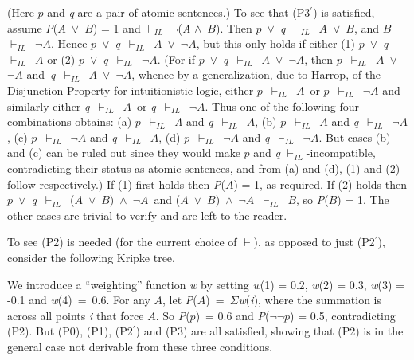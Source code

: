 \documentclass[
  11pt,
  letterpaper,
  DIV=11,
  numbers=noendperiod,
  oneside]{scrartcl}
\begin{document}
(Here \(p\) and \emph{q} are a pair of atomic sentences.) To see that
(P3\(^\prime\)) is satisfied, assume \emph{P}(\(A\)~\({\vee}\)~\(B\)) =
1 and \(\vdash_{IL}\) \({\lnot}\)(\emph{A} \({\wedge}\)~\(B\)). Then
\(p\)~\({\vee}\)~\emph{q}~\(\vdash_{IL}\)~\(A\)~\({\vee}\)~\(B\), and
\(B\)~\(\vdash_{IL}\)~\({\lnot}\)\(A\). Hence
\(p\)~\({\vee}\)~\emph{q}~\(\vdash_{IL}\)~\(A\)~\({\vee}\)~\({\lnot}\)\(A\),
but this only holds if either (1)
\(p\)~\({\vee}\)~\emph{q}~\(\vdash_{IL}\)~\(A\) or (2)
\(p\)~\({\vee}\)~\emph{q}~\(\vdash_{IL}\)~\({\lnot}\)\(A\). (For if
\(p\)~\({\vee}\)~\emph{q}~\(\vdash_{IL}\)~\(A\)~\({\vee}\)~\({\lnot}\)\(A\),
then \(p\)~\(\vdash_{IL}\)~\(A\)~\({\vee}\)~\({\lnot}\)\(A\)
and~\emph{q}~\(\vdash_{IL}\)~\(A\)~\({\vee}\)~\({\lnot}\)\(A\), whence
by a generalization, due to Harrop, of the Disjunction Property for
intuitionistic logic, either \(p\)~\(\vdash_{IL}\)~\(A\)~or
\(p\)~\(\vdash_{IL}\)~\({\lnot}\)\(A\) and similarly either
\emph{q}~\(\vdash_{IL}\)~\(A\)~or
\emph{q}~\(\vdash_{IL}\)~\({\lnot}\)\(A\). Thus one of the following
four combinations obtains: (a) \(p\)~\(\vdash_{IL}\)~\emph{A} and
\emph{q}~\(\vdash_{IL}\)~\(A\), (b) \(p\)~\(\vdash_{IL}\)~\(A\) and
\emph{q}~\(\vdash_{IL}\)~\({\lnot}\)\(A\), (c)
\(p\)~\(\vdash_{IL}\)~\({\lnot}\)\(A\) and
\emph{q}~\(\vdash_{IL}\)~\(A\), (d)
\(p\)~\(\vdash_{IL}\)~\({\lnot}\)\(A\) and
\emph{q}~\(\vdash_{IL}\)~\({\lnot}\)\(A\). But cases (b) and (c) can be
ruled out since they would make \(p\) and \emph{q}
\(\vdash_{IL}\)-incompatible, contradicting their status as atomic
sentences, and from (a) and (d), (1) and (2) follow respectively.) If
(1) first holds then \emph{P}(\(A\)) = 1, as required. If (2) holds then
\(p\)~\({\vee}\)~\emph{q}~\(\vdash_{IL}\)~(\(A\)~\({\vee}\)~\(B\))~\({\wedge}\)~\({\lnot}\)\(A\)~and
(\(A\)~\({\vee}\)~\(B\))~\({\wedge}\)~\({\lnot}\)\(A\)~\(\vdash_{IL}\)~\(B\),
so \emph{P}(\(B\)) = 1. The other cases are trivial to verify and are
left to the reader.

To see (P2) is needed (for the current choice of \(\vdash\)), as opposed
to just (P2\(^\prime\)), consider the following Kripke tree.

We introduce a ``weighting'' function \emph{w} by setting \emph{w}(1) =
0.2, \emph{w}(2) = 0.3, \emph{w}(3) = -0.1 and \emph{w}(4)~=~0.6. For
any \(A\), let \emph{P}(\(A\))~=~\({\Sigma}\)\emph{w}(\emph{i}), where
the summation is across all points \emph{i} that force \(A\). So
\emph{P}(\(p\))~= 0.6 and \emph{P}(\({\lnot}{\lnot}\)\(p\)) = 0.5,
contradicting (P2). But (P0), (P1), (P2\(^\prime\)) and (P3) are all
satisfied, showing that (P2) is in the general case not derivable from
these three conditions.
\end{document}
